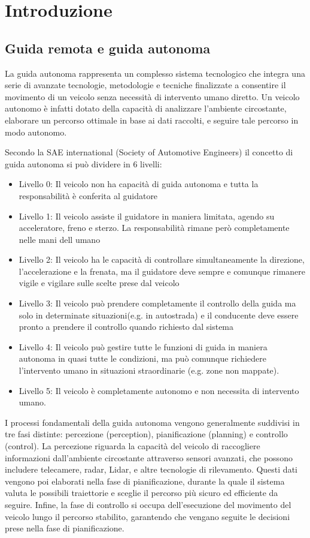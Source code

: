 \section{Introduzione}
\subsection{Guida remota e guida autonoma}
La guida autonoma rappresenta un complesso sistema tecnologico che integra una serie di avanzate tecnologie, metodologie e tecniche finalizzate a consentire il movimento di un veicolo senza necessità di intervento umano diretto. Un veicolo autonomo è infatti dotato della capacità di analizzare l'ambiente circostante, elaborare un percorso ottimale in base ai dati raccolti, e seguire tale percorso in modo autonomo. 

\noindent Secondo la SAE international (Society of Automotive Engineers)\cite{SAE_autonomous_vehicle} il concetto di guida autonoma si può dividere in 6 livelli:

\begin{itemize}
  \item Livello 0: Il veicolo non ha capacità di guida autonoma e tutta la responsabilità è conferita al guidatore  
  \item Livello 1: Il veicolo assiste il guidatore in maniera limitata, agendo su acceleratore, freno e sterzo. La responsabilità rimane però completamente nelle mani dell umano 
  \item Livello 2: Il veicolo ha le capacità di controllare simultaneamente la direzione, l'accelerazione e la frenata, ma il guidatore deve sempre e comunque rimanere vigile e vigilare sulle scelte prese dal veicolo
  \item Livello 3: Il veicolo può prendere completamente il controllo della guida ma solo in determinate situazioni(e.g. in autostrada) e il conducente deve essere pronto a prendere il controllo quando richiesto dal sistema
  \item Livello 4: Il veicolo può gestire tutte le funzioni di guida in maniera autonoma in quasi tutte le condizioni, ma può comunque richiedere l'intervento umano in situazioni straordinarie (e.g. zone non mappate).
  \item Livello 5: Il veicolo è completamente autonomo e non necessita di intervento umano.
\end{itemize}

\noindent I processi fondamentali della guida autonoma vengono generalmente suddivisi in tre fasi distinte: percezione (perception), pianificazione (planning) e controllo (control).
La percezione riguarda la capacità del veicolo di raccogliere informazioni dall'ambiente circostante attraverso sensori avanzati, che possono includere telecamere, radar, Lidar, e altre tecnologie di rilevamento. Questi dati vengono poi elaborati nella fase di pianificazione, durante la quale il sistema valuta le possibili traiettorie e sceglie il percorso più sicuro ed efficiente da seguire. Infine, la fase di controllo si occupa dell'esecuzione del movimento del veicolo lungo il percorso stabilito, garantendo che vengano seguite le decisioni prese nella fase di pianificazione.

